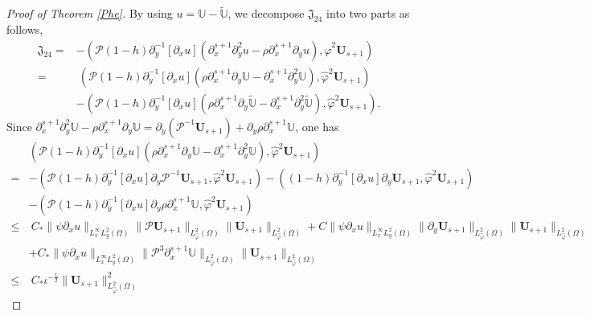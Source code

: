 \documentclass{amsart}
\numberwithin{equation}{section}
\begin{document}
\begin{proof}[Proof of Theorem \ref{Phe}]
By using $u=\mathbb{U}-\tilde{\mathbb{U}}$, we decompose $\mathfrak{J}_{24}$ into two parts as follows,
\begin{align}\label{JJ24}
\mathfrak{J}_{24}
=&-(\mathcal{P}(1-h)\partial_{y}^{-1}[\partial_{x}u](\partial_{x}^{s+1}\partial_{y}^{2}u-\rho\partial_{x}^{s+1}\partial_{y}u),\hat{\varphi}^{2}\mathbf{U}_{s+1})\\
=&~(\mathcal{P}(1-h)\partial_{y}^{-1}[\partial_{x}u](\rho\partial_{x}^{s+1}\partial_{y}\mathbb{U}-\partial_{x}^{s+1}\partial_{y}^{2}\mathbb{U}),\hat{\varphi}^{2}\mathbf{U}_{s+1})\nonumber\\
 &-(\mathcal{P}(1-h)\partial_{y}^{-1}[\partial_{x}u](\rho\partial_{x}^{s+1}\partial_{y}\tilde{\mathbb{U}}-\partial_{x}^{s+1}\partial_{y}^{2}\tilde{\mathbb{U}}),\hat{\varphi}^{2}\mathbf{U}_{s+1}).\nonumber
\end{align}
Since $\partial_{x}^{s+1}\partial_{y}^{2}\mathbb{U}-\rho\partial_{x}^{s+1}\partial_{y}\mathbb{U}=\partial_{y}(\mathcal{P}^{-1}\mathbf{U}_{s+1})+\partial_{y}\rho\partial_{x}^{s+1}\mathbb{U}$,
one has
\begin{align}\label{JJ241}
&(\mathcal{P}(1-h)\partial_{y}^{-1}[\partial_{x}u](\rho\partial_{x}^{s+1}\partial_{y}\mathbb{U}-\partial_{x}^{s+1}\partial_{y}^{2}\mathbb{U}),\hat{\varphi}^{2}\mathbf{U}_{s+1})\\
=&-(\mathcal{P}(1-h)\partial_{y}^{-1}[\partial_{x}u]\partial_{y}\mathcal{P}^{-1}\mathbf{U}_{s+1},\hat{\varphi}^{2}\mathbf{U}_{s+1})
  -((1-h)\partial_{y}^{-1}[\partial_{x}u]\partial_{y}\mathbf{U}_{s+1},\hat{\varphi}^{2}\mathbf{U}_{s+1})\nonumber\\
 &-(\mathcal{P}(1-h)\partial_{y}^{-1}[\partial_{x}u]\partial_{y}\rho\partial_{x}^{s+1}\mathbb{U},\hat{\varphi}^{2}\mathbf{U}_{s+1})\nonumber\\
\leq&~C_{*}\|\psi\partial_{x}u\|_{L_{x}^{\infty}L_{y}^{2}(\Omega)}
           \|\mathcal{P}\mathbf{U}_{s+1}\|_{L_{\hat{\varphi}}^{2}(\Omega)}
           \|\mathbf{U}_{s+1}\|_{L_{\hat{\varphi}}^{2}(\Omega)}
     +C\|\psi\partial_{x}u\|_{L_{x}^{\infty}L_{y}^{2}(\Omega)}
       \|\partial_{y}\mathbf{U}_{s+1}\|_{L_{\hat{\varphi}}^{2}(\Omega)}
       \|\mathbf{U}_{s+1}\|_{L_{\hat{\varphi}}^{2}(\Omega)}\nonumber\\
    &+C_{*}\|\psi\partial_{x}u\|_{L_{x}^{\infty}L_{y}^{2}(\Omega)}
           \|\mathcal{P}^{3}\partial_{x}^{s+1}\mathbb{U}\|_{L_{\hat{\varphi}}^{2}(\Omega)}
           \|\mathbf{U}_{s+1}\|_{L_{\hat{\varphi}}^{2}(\Omega)}\nonumber\\
\leq&~C_{*}\iota^{-\frac{1}{2}}\|\mathbf{U}_{s+1}\|_{L_{\hat{\varphi}}^{2}(\Omega)}^{2}

\end{align}
\end{proof}
\end{document}

